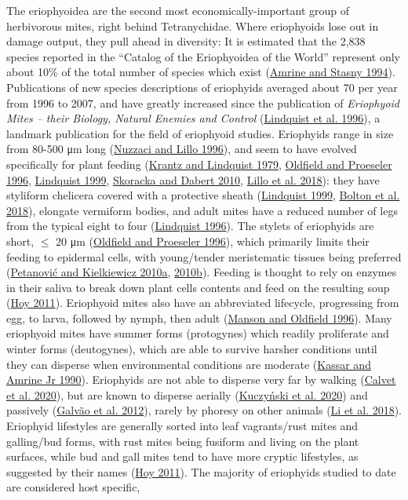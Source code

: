 \documentclass[12pt,final,CPage]{ufthesis}
\begin{document}
{  The eriophyoidea are the second most economically-important group of herbivorous mites, right behind Tetranychidae. Where eriophyoids lose out in damage output, they pull ahead in diversity: It is estimated that the 2,838 species reported in the ``Catalog of the Eriophyoidea of the World'' represent only about 10\% of the total number of species which exist (\protect\hyperlink{ref-Amrine1994}{Amrine and Stasny 1994}). Publications of new species descriptions of eriophyids averaged about 70 per year from 1996 to 2007, and have greatly increased since the publication of \emph{Eriophyoid Mites -- their Biology, Natural Enemies and Control} (\protect\hyperlink{ref-Lindquist1996}{Lindquist et al. 1996}), a landmark publication for the field of eriophyoid studies. Eriophyids range in size from 80-500 \si{\micro\metre} long (\protect\hyperlink{ref-Nuzzaci1996}{Nuzzaci and Lillo 1996}), and seem to have evolved specifically for plant feeding (\protect\hyperlink{ref-Krantz1979}{Krantz and Lindquist 1979}, \protect\hyperlink{ref-Oldfield1996a}{Oldfield and Proeseler 1996}, \protect\hyperlink{ref-Lindquist1999}{Lindquist 1999}, \protect\hyperlink{ref-Skoracka2010}{Skoracka and Dabert 2010}, \protect\hyperlink{ref-Lillo2018}{Lillo et al. 2018}): they have styliform chelicera covered with a protective sheath (\protect\hyperlink{ref-Lindquist1999}{Lindquist 1999}, \protect\hyperlink{ref-Bolton2018}{Bolton et al. 2018}), elongate vermiform bodies, and adult mites have a reduced number of legs from the typical eight to four (\protect\hyperlink{ref-Lindquist1996a}{Lindquist 1996}). The stylets of eriophyids are short, \(\le\) 20 \si{\micro\metre} (\protect\hyperlink{ref-Oldfield1996a}{Oldfield and Proeseler 1996}), which primarily limits their feeding to epidermal cells, with young/tender meristematic tissues being preferred (\protect\hyperlink{ref-Petanovic2010}{Petanović and Kielkiewicz 2010a}, \protect\hyperlink{ref-Petanovic2010a}{2010b}). Feeding is thought to rely on enzymes in their saliva to break down plant cells contents and feed on the resulting soup (\protect\hyperlink{ref-Hoy2011}{Hoy 2011}). Eriophyoid mites also have an abbreviated lifecycle, progressing from egg, to larva, followed by nymph, then adult (\protect\hyperlink{ref-Manson1996}{Manson and Oldfield 1996}). Many eriophyoid mites have summer forms (protogynes) which readily proliferate and winter forms (deutogynes), which are able to survive harsher conditions until they can disperse when environmental conditions are moderate (\protect\hyperlink{ref-Kassar1990}{Kassar and Amrine Jr 1990}). Eriophyids are not able to disperse very far by walking (\protect\hyperlink{ref-Calvet2020}{Calvet et al. 2020}), but are known to disperse aerially (\protect\hyperlink{ref-Kuczynski2020}{Kuczyński et al. 2020}) and passively (\protect\hyperlink{ref-Galvao2012}{Galvão et al. 2012}), rarely by phoresy on other animals (\protect\hyperlink{ref-Li2018}{Li et al. 2018}). Eriophyid lifestyles are generally sorted into leaf vagrants/rust mites and galling/bud forms, with rust mites being fusiform and living on the plant surfaces, while bud and gall mites tend to have more cryptic lifestyles, as suggested by their names (\protect\hyperlink{ref-Hoy2011}{Hoy 2011}). The majority of eriophyids studied to date are considered host specific, }
\end{document}
